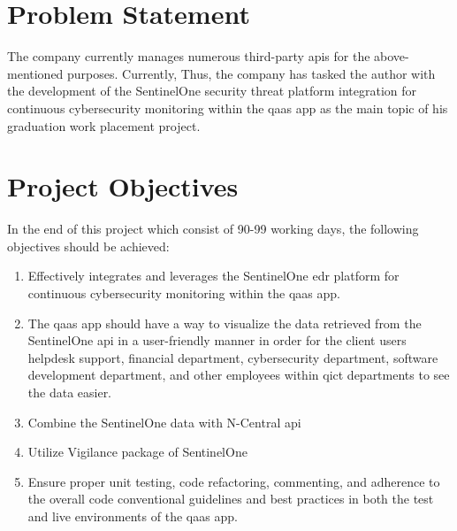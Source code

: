 \begin{multicols}{2}
      \section{Problem Statement}
      The company currently manages numerous third-party \acrshort{api}s for the above-mentioned purposes.
      Currently,
      Thus, the company has tasked the author with the development of the SentinelOne security threat platform integration
      for continuous cybersecurity monitoring within the \acrshort{qaas} app as the main topic of his graduation work placement
      project.

      \section{Project Objectives}
      In the end of this project which consist of 90-99 working days, the following objectives should be achieved:
      \begin{enumerate}
            \item Effectively integrates and leverages the SentinelOne \acrshort{edr} platform for continuous
                  cybersecurity monitoring within the \acrshort{qaas} app.
            \item The \acrshort{qaas} app should have a way to visualize the data retrieved from the SentinelOne
                  \acrshort{api} in a user-friendly manner in order for the client users helpdesk support, financial
                  department, cybersecurity department, software development department, and other employees within
                  \acrshort{qict}  departments to see the data easier.
            \item Combine the SentinelOne data with N-Central \acrshort{api}
            \item Utilize Vigilance package of SentinelOne
            \item Ensure proper unit testing, code refactoring, commenting, and adherence to the overall code
                  conventional guidelines and best practices in both the test and live environments of the
                  \acrshort{qaas} app.
      \end{enumerate}

\end{multicols}
